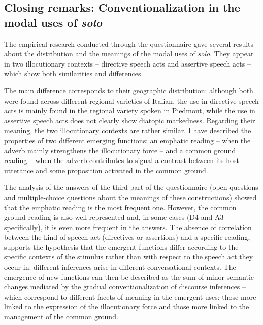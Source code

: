 \subsection{Closing remarks: Conventionalization in the modal uses of \textit{solo}}
\hypertarget{Toc124860679}{}
The empirical research conducted through the questionnaire gave several results about the distribution and the meanings of the modal uses of \textit{solo}. They appear in two illocutionary contexts – directive speech acts and assertive speech acts – which show both similarities and differences.

The main difference corresponds to their geographic distribution: although both were found across different regional varieties of Italian, the use in directive speech acts is mainly found in the regional variety spoken in Piedmont, while the use in assertive speech acts does not clearly show diatopic markedness. Regarding their meaning, the two illocutionary contexts are rather similar. I have described the properties of two different emerging functions: an emphatic reading – when the adverb mainly strengthens the illocutionary force – and a common ground reading – when the adverb contributes to signal a contrast between its host utterance and some proposition activated in the common ground.

The analysis of the answers of the third part of the questionnaire (open questions and multiple-choice questions about the meanings of these constructions) showed that the emphatic reading is the most frequent one. However, the common ground reading is also well represented and, in some cases (D4 and A3 specifically), it is even more frequent in the answers. The absence of correlation between the kind of speech act (directives or assertions) and a specific reading, supports the hypothesis that the emergent functions differ according to the specific contexts of the stimulus rather than with respect to the speech act they occur in: different inferences arise in different conversational contexts. The emergence of new functions can then be described as the sum of minor semantic changes mediated by the gradual conventionalization of discourse inferences – which correspond to different facets of meaning in the emergent uses: those more linked to the expression of the illocutionary force and those more linked to the management of the common ground.

